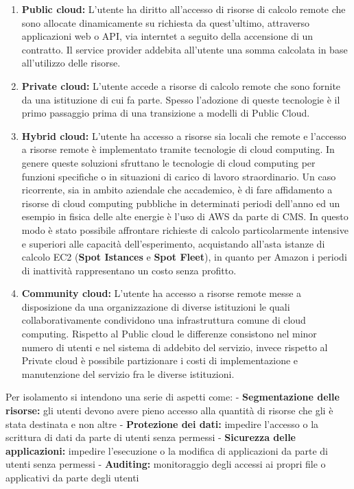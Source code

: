 \documentclass[italian,]{article}
\providecommand{\tightlist}{%
  \setlength{\itemsep}{0pt}\setlength{\parskip}{0pt}}
\begin{document}
\begin{enumerate}
\def\labelenumi{\arabic{enumi}.}
\tightlist
\item
  \textbf{Public cloud:} L'utente ha diritto all'accesso di risorse di
  calcolo remote che sono allocate dinamicamente su richiesta da
  quest'ultimo, attraverso applicazioni web o API, via interntet a
  seguito della accensione di un contratto. Il service provider addebita
  all'utente una somma calcolata in base all'utilizzo delle risorse.
\item
  \textbf{Private cloud:} L'utente accede a risorse di calcolo remote
  che sono fornite da una istituzione di cui fa parte. Spesso l'adozione
  di queste tecnologie è il primo passaggio prima di una transizione a
  modelli di Public Cloud. 
\item
  \textbf{Hybrid cloud:} L'utente ha accesso a risorse sia locali che
  remote e l'accesso a risorse remote è implementato tramite tecnologie
  di cloud computing. In genere queste soluzioni sfruttano le tecnologie
  di cloud computing per funzioni specifiche o in situazioni di carico
  di lavoro straordinario. Un caso ricorrente, sia in ambito aziendale
  che accademico, è di fare affidamento a risorse di cloud computing
  pubbliche in determinati periodi dell'anno ed un esempio in fisica
  delle alte energie è l'uso di AWS da parte di CMS. In questo modo è
  stato possibile affrontare richieste di calcolo particolarmente
  intensive e superiori alle capacità dell'esperimento, acquistando
  all'asta istanze di calcolo EC2 (\textbf{Spot Istances} e \textbf{Spot
  Fleet}), in quanto per Amazon i periodi di inattività rappresentano un
  costo senza profitto.
\item
  \textbf{Community cloud:} L'utente ha accesso a risorse remote messe a
  disposizione da una organizzazione di diverse istituzioni le quali
  collaborativamente condividono una infrastruttura comune di cloud
  computing. Rispetto al Public cloud le differenze consistono nel minor
  numero di utenti e nel sistema di addebito del servizio, invece
  rispetto al Private cloud è possibile partizionare i costi di
  implementazione e manutenzione del servizio fra le diverse
  istituzioni.
\end{enumerate}

Per isolamento si intendono una serie di aspetti come: -
\textbf{Segmentazione delle risorse:} gli utenti devono avere pieno
accesso alla quantità di risorse che gli è stata destinata e non altre -
\textbf{Protezione dei dati:} impedire l'accesso o la scrittura di dati
da parte di utenti senza permessi - \textbf{Sicurezza delle
applicazioni:} impedire l'esecuzione o la modifica di applicazioni da
parte di utenti senza permessi - \textbf{Auditing:} monitoraggio degli
accessi ai propri file o applicativi da parte degli utenti
\end{document}
